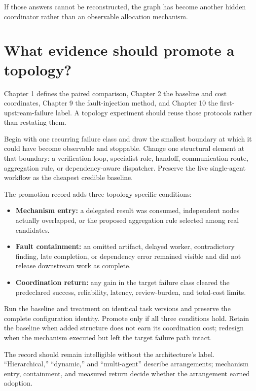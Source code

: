If those answers cannot be reconstructed, the graph has become another hidden coordinator rather than an observable allocation mechanism.

\hypertarget{what-evidence-should-promote-a-topology}{%
\section{What evidence should promote a topology?}\label{what-evidence-should-promote-a-topology}}

Chapter 1 defines the paired comparison, Chapter 2 the baseline and cost coordinates, Chapter 9 the fault-injection method, and Chapter 10 the first-upstream-failure label. A topology experiment should reuse those protocols rather than restating them.

Begin with one recurring failure class and draw the smallest boundary at which it could have become observable and stoppable. Change one structural element at that boundary: a verification loop, specialist role, handoff, communication route, aggregation rule, or dependency-aware dispatcher. Preserve the live single-agent workflow as the cheapest credible baseline.


The promotion record adds three topology-specific conditions:

\begin{itemize}
\tightlist
\item
  \textbf{Mechanism entry:} a delegated result was consumed, independent nodes actually overlapped, or the proposed aggregation rule selected among real candidates.
\item
  \textbf{Fault containment:} an omitted artifact, delayed worker, contradictory finding, late completion, or dependency error remained visible and did not release downstream work as complete.
\item
  \textbf{Coordination return:} any gain in the target failure class cleared the predeclared success, reliability, latency, review-burden, and total-cost limits.
\end{itemize}

Run the baseline and treatment on identical task versions and preserve the complete configuration identity. Promote only if all three conditions hold. Retain the baseline when added structure does not earn its coordination cost; redesign when the mechanism executed but left the target failure path intact.

The record should remain intelligible without the architecture's label. ``Hierarchical,'' ``dynamic,'' and ``multi-agent'' describe arrangements; mechanism entry, containment, and measured return decide whether the arrangement earned adoption.

